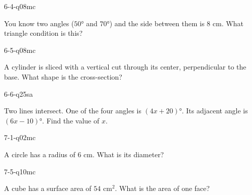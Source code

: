 \begin{practiceQuestion}{6-4-q08}{mc}
\begin{questionText}
You know two angles ($50°$ and $70°$) and the side between them is $8$ cm. What triangle condition is this?
\end{questionText}
\end{practiceQuestion}

\begin{practiceQuestion}{6-5-q08}{mc}
\begin{questionText}
A cylinder is sliced with a vertical cut through its center, perpendicular to the base. What shape is the cross-section?
\end{questionText}
\end{practiceQuestion}

\begin{practiceQuestion}{6-6-q25}{sa}
\begin{questionText}
Two lines intersect. One of the four angles is $(4x + 20)°$. Its adjacent angle is $(6x - 10)°$. Find the value of $x$.
\end{questionText}
\end{practiceQuestion}

\begin{practiceQuestion}{7-1-q02}{mc}
\begin{questionText}
A circle has a radius of $6$ cm. What is its diameter?
\end{questionText}
\end{practiceQuestion}

\begin{practiceQuestion}{7-5-q10}{mc}
\begin{questionText}
A cube has a surface area of $54$ cm$^2$. What is the area of one face?
\end{questionText}
\end{practiceQuestion}

